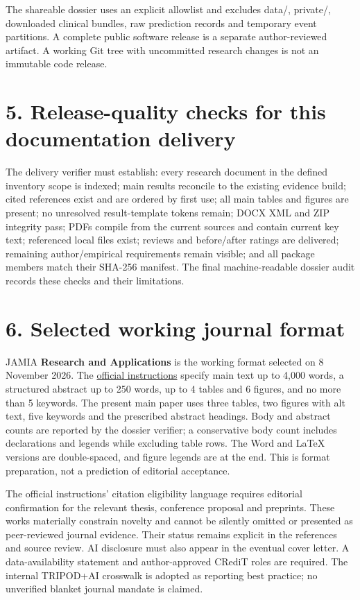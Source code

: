 \documentclass[11pt,a4paper]{article}
\begin{document}
The shareable dossier uses an explicit allowlist and excludes data/, private/, downloaded clinical bundles, raw prediction records and temporary event partitions. A complete public software release is a separate author-reviewed artifact. A working Git tree with uncommitted research changes is not an immutable code release.

\section*{5. Release-quality checks for this documentation delivery}
The delivery verifier must establish: every research document in the defined inventory scope is indexed; main results reconcile to the existing evidence build; cited references exist and are ordered by first use; all main tables and figures are present; no unresolved result-template tokens remain; DOCX XML and ZIP integrity pass; PDFs compile from the current sources and contain current key text; referenced local files exist; reviews and before/after ratings are delivered; remaining author/empirical requirements remain visible; and all package members match their SHA-256 manifest. The final machine-readable dossier audit records these checks and their limitations.

\section*{6. Selected working journal format}
JAMIA \textbf{Research and Applications} is the working format selected on 8 November 2026. The \href{https://academic.oup.com/jamia/pages/General_Instructions}{official instructions} specify main text up to 4,000 words, a structured abstract up to 250 words, up to 4 tables and 6 figures, and no more than 5 keywords. The present main paper uses three tables, two figures with alt text, five keywords and the prescribed abstract headings. Body and abstract counts are reported by the dossier verifier; a conservative body count includes declarations and legends while excluding table rows. The Word and LaTeX versions are double-spaced, and figure legends are at the end. This is format preparation, not a prediction of editorial acceptance.

The official instructions' citation eligibility language requires editorial confirmation for the relevant thesis, conference proposal and preprints. These works materially constrain novelty and cannot be silently omitted or presented as peer-reviewed journal evidence. Their status remains explicit in the references and source review. AI disclosure must also appear in the eventual cover letter. A data-availability statement and author-approved CRediT roles are required. The internal TRIPOD+AI crosswalk is adopted as reporting best practice; no unverified blanket journal mandate is claimed.
\end{document}
